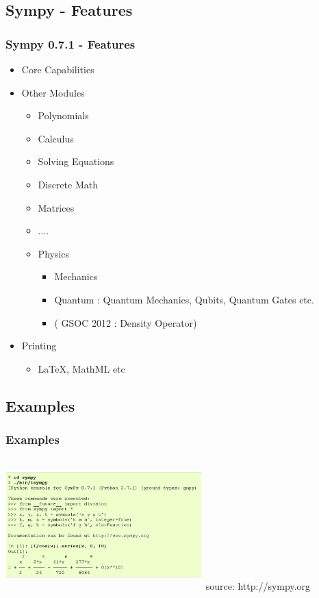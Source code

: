 \documentclass[dvips]{beamer}
\begin{document}
\subsection{Sympy - Features}
\begin{frame}
\frametitle{Sympy 0.7.1 - Features}

\begin{itemize}
\item Core Capabilities
\pause
\item Other Modules
  \begin{itemize}
     \item Polynomials
     \item Calculus
     \item Solving Equations
     \item Discrete Math
     \item Matrices
     \item ....
     \item Physics
        \begin{itemize}
              \item Mechanics
              \item Quantum : Quantum Mechanics, Qubits, Quantum Gates etc.
              \item ( GSOC 2012 : Density Operator)
        \end{itemize}
  \end{itemize}
\pause
\item Printing
  \begin{itemize}
    \item \LaTeX, MathML etc
  \end{itemize}
 \end{itemize}
\end{frame}


\subsection{Examples}
\begin{frame}
\frametitle{Examples}
\includegraphics[height=2in,width=3in]{ex1.ps}\newline
\tiny{source: http://sympy.org}
\end{frame}
\end{document}
